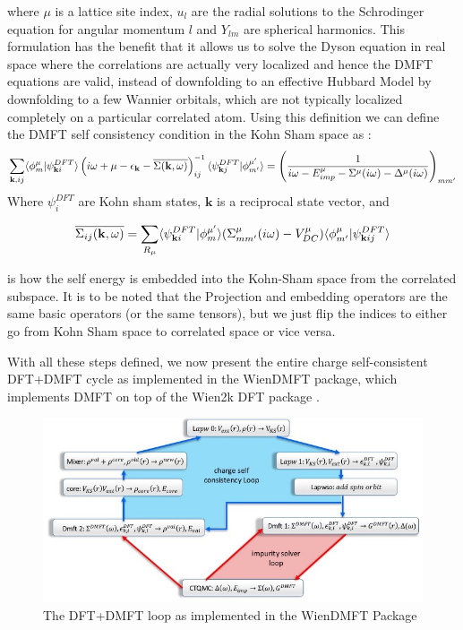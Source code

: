 \documentclass[10pt]{ruthesis}
\begin{document}
where $\mu$ is a lattice site index, $u_l$ are the radial solutions to the Schrodinger equation for angular momentum $l$ and  $Y_{lm}$ are spherical harmonics. This formulation has the benefit that it allows us to solve the Dyson equation in real space where the correlations are actually very localized and hence the DMFT equations are valid, instead of downfolding to an effective Hubbard Model by  downfolding to a few Wannier orbitals, which are not typically localized completely on a particular correlated atom. Using this definition we can define the  DMFT self consistency condition in the Kohn Sham space as :
\begin{equation}\label{DFT+DMFT SC}
\sum_{\mathbf{k},ij} \langle \phi^\mu_m|\psi^{DFT}_{\mathbf{k} i} \rangle \left( i\omega +\mu -\epsilon_{\mathbf{k}} -\overline{\Sigma(\mathbf{k} ,\omega)} \right)^{-1}_{ij}\langle\psi^{DFT}_{\mathbf{k} j}  |\phi^{\mu'}_{m'} \rangle = \left( \dfrac{1}{i\omega -E^{\mu}_{imp}-\Sigma^{\mu}(i\omega)-\Delta^{\mu}(i\omega)} \right) _{mm'}
\end{equation}
Where $\psi^{DFT}_i$ are Kohn sham states, $\mathbf{k}$ is a reciprocal state vector, and 

\begin{equation}\label{Embedding}
\overline{\Sigma_{ij}(\mathbf{k} ,\omega)}= \sum_{R_\mu} \langle\psi^{DFT}_{\mathbf{k} i}  |\phi^{\mu'}_{m} \rangle (\Sigma^{\mu}_{mm'} (i\omega) -V^{\mu}_{DC} )\langle \phi^\mu_{m'}|\psi^{DFT}_{\mathbf{k} ij} \rangle
\end{equation}

is how the self energy is embedded into the Kohn-Sham space from the correlated subspace. It is to be noted that the Projection and embedding operators are the same basic operators (or the same tensors), but we just flip the indices to either go from Kohn Sham space to correlated space or vice versa.
 
With all these steps defined, we now present the entire charge self-consistent DFT+DMFT cycle as implemented in the WienDMFT \cite{PRB_dmft_wien2k_2010_Chuck_Haule} package, which implements DMFT on top of the Wien2k DFT package \cite{wien2k}. 

\begin{figure}[H]
 \includegraphics[width=\columnwidth]{Dmft_loop.jpg}
 \caption{The DFT+DMFT loop as implemented in the WienDMFT Package \label{DMFT_Loop}}
\end{figure}
\end{document}
